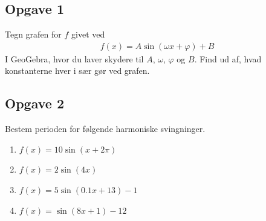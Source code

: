 \subsection*{Opgave 1}
Tegn grafen for $f$ givet ved
\begin{align*}
	f(x) = A\sin(\omega x + \varphi) + B
\end{align*}
I GeoGebra, hvor du laver skydere til $A$, $\omega$, $\varphi$ og $B$. Find ud af, hvad konstanterne hver i sær gør ved grafen. 

\subsection*{Opgave 2}
Bestem perioden for følgende harmoniske svingninger.
\begin{enumerate}[label=\roman*)]
	\item $f(x) = 10\sin(x + 2\pi)$
	\item $f(x) = 2\sin(4x)$
	\item $f(x) = 5\sin(0.1x + 13)-1$
	\item $f(x) = \sin(8x +1)-12$
\end{enumerate}
